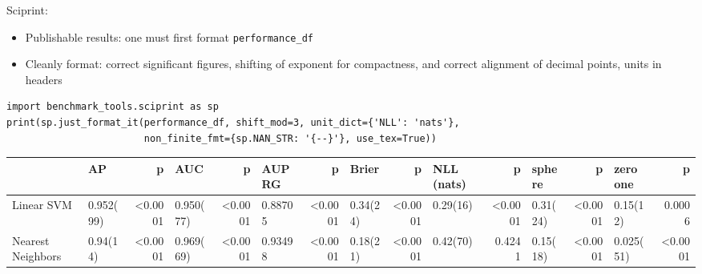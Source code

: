\documentclass[a0,landscape]{a0poster}
\newcommand{\code}{\texttt}
\begin{document}
\begin{multicols}{3}
Sciprint:
\begin{itemize}
  \item Publishable results: one must first format \code{performance\_df}
  \item Cleanly format: correct significant figures, shifting of exponent for compactness, and correct alignment of decimal points, units in headers
\end{itemize}
%
\begin{verbatim}
import benchmark_tools.sciprint as sp
print(sp.just_format_it(performance_df, shift_mod=3, unit_dict={'NLL': 'nats'},
                        non_finite_fmt={sp.NAN_STR: '{--}'}, use_tex=True))
\end{verbatim}
%
\begin{center}
{\tiny
\setlength{\tabcolsep}{0.75em} %
\begin{tabular}{|l|l|r|l|r|l|r|l|r|l|r|l|r|l|r|}
\toprule
{}                &       {AP} &      {p} &      {AUC} &      {p} &  {AUPRG} &      {p} &    {Brier} &      {p} & {NLL (nats)} &      {p} &   {sphere} &      {p} & {zero one} &      {p} \\
\midrule
Linear SVM        &  0.952(99) &  <0.0001 &  0.950(77) &  <0.0001 &  0.88705 &  <0.0001 &  0.34(24)  &  <0.0001 &    0.29(16)  &  <0.0001 &  0.31(24)  &  <0.0001 &  0.15(12)  &   0.0006 \\
Nearest Neighbors &  0.94(14)  &  <0.0001 &  0.969(69) &  <0.0001 &  0.93498 &  <0.0001 &  0.18(21)  &  <0.0001 &    0.42(70)  &   0.4241 &  0.15(18)  &  <0.0001 &  0.025(51) &  <0.0001 \\

\end{tabular}}
\end{center}
\end{multicols}
\end{document}
